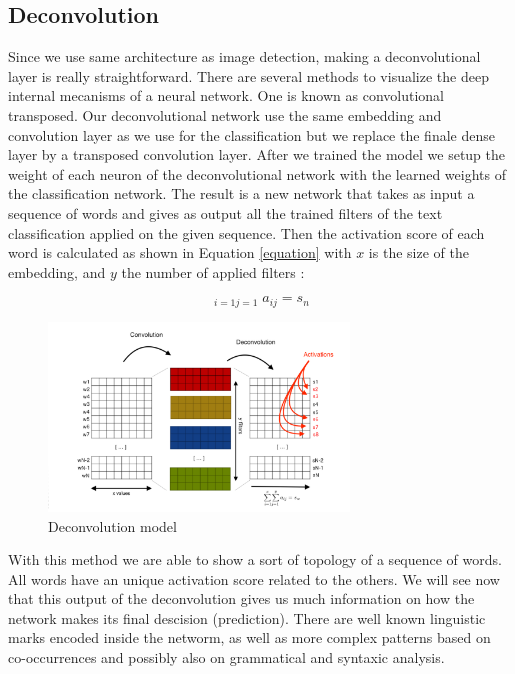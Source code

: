 \subsection{Deconvolution}

Since we use same architecture as image detection, making a deconvolutional layer is really straightforward. There are several methods to visualize the deep internal mecanisms of a neural network. One is known as convolutional transposed. Our deconvolutional network use the same embedding and convolution layer as we use for the classification but we replace the finale dense layer by a transposed convolution layer. After we trained the model we setup the weight of each neuron of the deconvolutional network with the learned weights of the classification network. The result is a new network that takes as input a sequence of words and gives as output all the trained filters of the text classification applied on the given sequence. Then the activation score of each word is calculated as shown in Equation \ref{equation} with $x$ is the size of the embedding, and $y$ the number of applied filters : 

\begin{equation}
\mathop{\sum^{x}\sum^{y}}_{i=1  j=1}  a_{ij} = s_{n}
\label{equation}
\end{equation}

\begin{figure}[h]
\begin{center}
\includegraphics[width=8cm]{img/model_deconv.png}
\caption{Deconvolution model}
\label{cnn}
\end{center}
\end{figure}

With this method we are able to show a sort of topology of a sequence of words. All words have an unique activation score related to the others. We will see now that this output of the deconvolution gives us much information on how the network makes its final descision (prediction). There are well known linguistic marks encoded inside the networm, as well as more complex patterns based on co-occurrences and possibly also on grammatical and syntaxic analysis.
